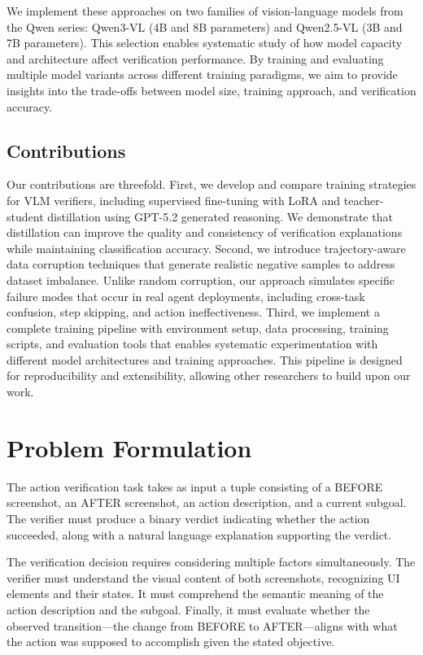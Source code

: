 \documentclass[11pt,a4paper]{article}
\begin{document}
We implement these approaches on two families of vision-language models from the Qwen series: Qwen3-VL (4B and 8B parameters) and Qwen2.5-VL (3B and 7B parameters). This selection enables systematic study of how model capacity and architecture affect verification performance. By training and evaluating multiple model variants across different training paradigms, we aim to provide insights into the trade-offs between model size, training approach, and verification accuracy.

\subsection{Contributions}

Our contributions are threefold. First, we develop and compare training strategies for VLM verifiers, including supervised fine-tuning with LoRA and teacher-student distillation using GPT-5.2 generated reasoning. We demonstrate that distillation can improve the quality and consistency of verification explanations while maintaining classification accuracy. Second, we introduce trajectory-aware data corruption techniques that generate realistic negative samples to address dataset imbalance. Unlike random corruption, our approach simulates specific failure modes that occur in real agent deployments, including cross-task confusion, step skipping, and action ineffectiveness. Third, we implement a complete training pipeline with environment setup, data processing, training scripts, and evaluation tools that enables systematic experimentation with different model architectures and training approaches. This pipeline is designed for reproducibility and extensibility, allowing other researchers to build upon our work.


\section{Problem Formulation}

The action verification task takes as input a tuple consisting of a BEFORE screenshot, an AFTER screenshot, an action description, and a current subgoal. The verifier must produce a binary verdict indicating whether the action succeeded, along with a natural language explanation supporting the verdict.

The verification decision requires considering multiple factors simultaneously. The verifier must understand the visual content of both screenshots, recognizing UI elements and their states. It must comprehend the semantic meaning of the action description and the subgoal. Finally, it must evaluate whether the observed transition---the change from BEFORE to AFTER---aligns with what the action was supposed to accomplish given the stated objective.
\end{document}
